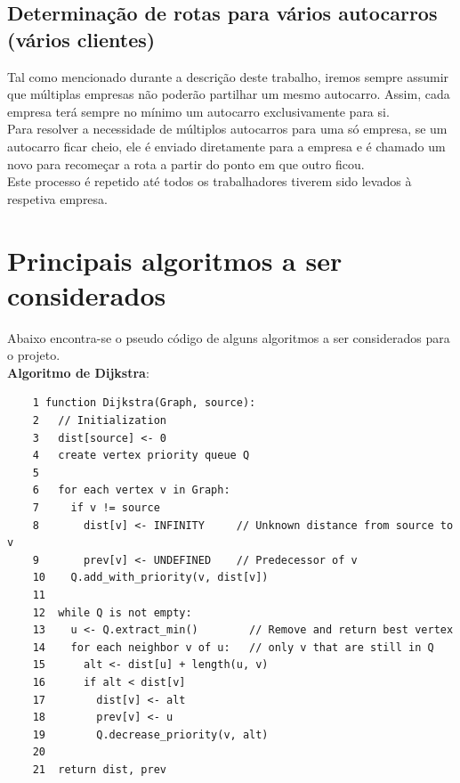 \documentclass{report}
\begin{document}
    \subsection{Determinação de rotas para vários autocarros (vários clientes)}
      Tal como mencionado durante a descrição deste trabalho, iremos sempre
      assumir que múltiplas empresas não poderão partilhar um mesmo autocarro.
      Assim, cada empresa terá sempre no mínimo um autocarro exclusivamente para si.\\
      \newline
      Para resolver a necessidade de múltiplos autocarros para uma só empresa,
      se um autocarro ficar cheio, ele é enviado diretamente para a empresa e é
      chamado um novo para recomeçar a rota a partir do ponto em que outro ficou.\\
      Este processo é repetido até todos os trabalhadores tiverem sido levados
      à respetiva empresa.

  \newpage
  \section{Principais algoritmos a ser considerados}
    Abaixo encontra-se o pseudo código de alguns algoritmos a ser considerados
    para o projeto.\\

    \textbf{Algoritmo de Dijkstra\cite{DIJKSTRA}}:\\
    \begin{lstlisting}
    1 function Dijkstra(Graph, source):
    2   // Initialization
    3   dist[source] <- 0
    4   create vertex priority queue Q
    5
    6   for each vertex v in Graph:           
    7     if v != source
    8       dist[v] <- INFINITY     // Unknown distance from source to v
    9       prev[v] <- UNDEFINED    // Predecessor of v
    10    Q.add_with_priority(v, dist[v])
    11
    12  while Q is not empty:
    13    u <- Q.extract_min()        // Remove and return best vertex
    14    for each neighbor v of u:   // only v that are still in Q
    15      alt <- dist[u] + length(u, v) 
    16      if alt < dist[v]
    17        dist[v] <- alt
    18        prev[v] <- u
    19        Q.decrease_priority(v, alt)
    20
    21  return dist, prev
    \end{lstlisting}

    \newpage
\end{document}

